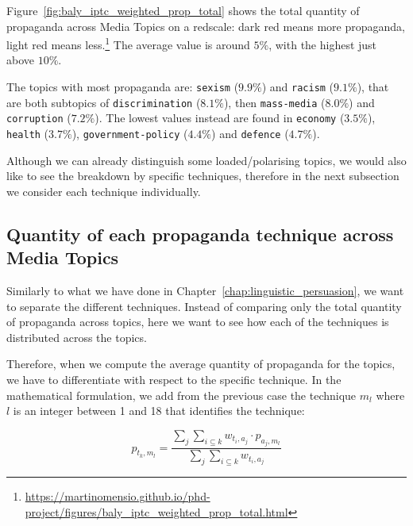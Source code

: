Figure~\ref{fig:baly_iptc_weighted_prop_total}
shows the total quantity of propaganda across Media Topics on a redscale: dark red means more propaganda, light red means less.\footnote{\url{https://martinomensio.github.io/phd-project/figures/baly_iptc_weighted_prop_total.html}}
The average value is around $5\%$, with the highest just above $10\%$.

The topics with most propaganda are: \texttt{sexism} ($9.9\%$) and \texttt{racism} ($9.1\%$), that are both subtopics of \texttt{discrimination} ($8.1\%$), then \texttt{mass-media} ($8.0\%$) and \texttt{corruption} ($7.2\%$). The lowest values instead are found in \texttt{economy} ($3.5\%$), \texttt{health} ($3.7\%$), \texttt{government-policy} ($4.4\%$) and \texttt{defence} ($4.7\%$).

Although we can already distinguish some loaded/polarising topics, we would also like to see the breakdown by specific techniques, therefore in the next subsection we consider each technique individually.

\subsection{\statusgreen Quantity of each propaganda technique across Media Topics}
\label{ssec:topic_propaganda_tech}

Similarly to what we have done in Chapter~\ref{chap:linguistic_persuasion}, we want to separate the different techniques. Instead of comparing only the total quantity of propaganda across topics, here we want to see how each of the techniques is distributed across the topics. 

Therefore, when we compute the average quantity of propaganda for the topics, we have to differentiate with respect to the specific technique. In the mathematical formulation, we add from the previous case the technique $m_{l}$ where $l$ is an integer between 1 and 18 that identifies the technique:

$$ p_{t_{k},m_{l}} = \frac{ \sum_{j} \sum_{i\subseteq k} w_{t_{i},a_{j}} \cdot p_{a_{j},m_{l}} }{ \sum_{j} \sum_{i\subseteq k} w_{t_{i},a_{j}} } $$


